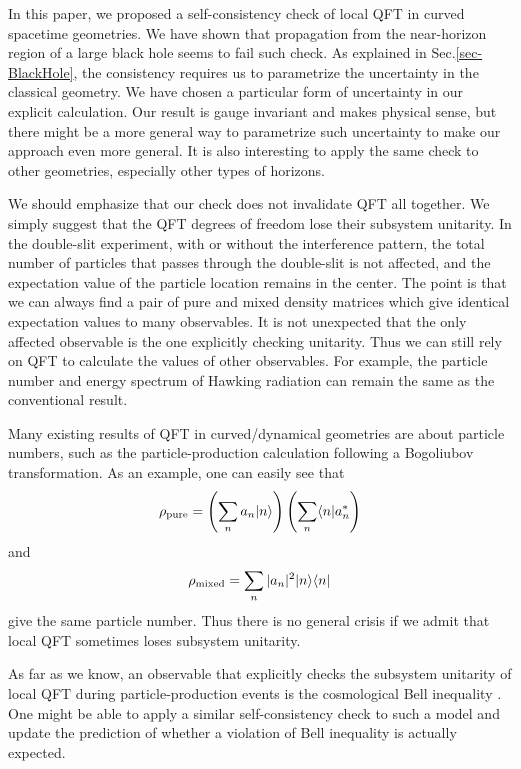 \documentclass[aps,showpacs,onecolumn,floats,prd,superscriptaddress,nofootinbib]{revtex4-1}
\begin{document}
In this paper, we proposed a self-consistency check of local QFT in curved spacetime geometries.
We have shown that propagation from the near-horizon region of a large black hole seems to fail such check.
As explained in Sec.\ref{sec-BlackHole}, the consistency requires us to parametrize the uncertainty in the classical geometry.
We have chosen a particular form of uncertainty in our explicit calculation.
Our result is gauge invariant and makes physical sense, but there might be a more general way to parametrize such uncertainty to make our approach even more general.
It is also interesting to apply the same check to other geometries, especially other types of horizons.

We should emphasize that our check does not invalidate QFT all together.
We simply suggest that the QFT degrees of freedom lose their subsystem unitarity.
In the double-slit experiment, with or without the interference pattern, the total number of particles that passes through the double-slit is not affected, and the expectation value of the particle location remains in the center.
The point is that we can always find a pair of pure and mixed density matrices which give identical expectation values to many observables.
It is not unexpected that the only affected observable is the one explicitly checking unitarity.
Thus we can still rely on QFT to calculate the values of other observables.
For example, the particle number and energy spectrum of Hawking radiation can remain the same as the conventional result.

Many existing results of QFT in curved/dynamical geometries are about particle numbers, such as the particle-production calculation following a Bogoliubov transformation. 
As an example, one can easily see that
\begin{equation}
\rho_{\rm pure} = \left(\sum_n a_n|n\rangle\right)
\left(\sum_n \langle n| a_n^*\right)
\end{equation}
and
\begin{equation}
\rho_{\rm mixed} = \sum_n |a_n|^2 |n\rangle\langle n|
\end{equation}
give the same particle number. 
Thus there is no general crisis if we admit that local QFT sometimes loses subsystem unitarity. 

As far as we know, an observable that explicitly checks the subsystem unitarity of local QFT during particle-production events is the cosmological Bell inequality \cite{Mal15}. 
One might be able to apply a similar self-consistency check to such a model and update the prediction of whether a violation of Bell inequality is actually expected.
\end{document}
